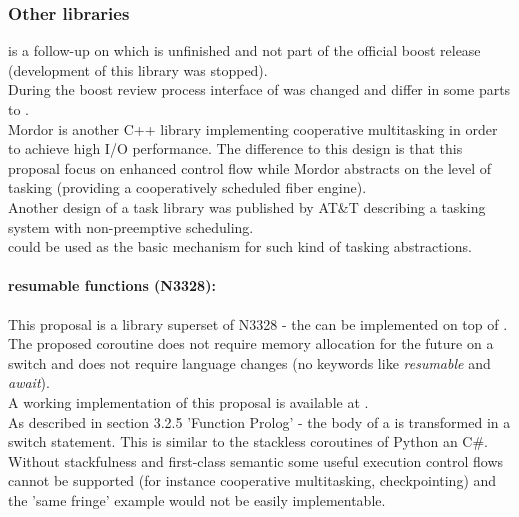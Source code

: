 \subsubsection*{Other libraries}
\boostcoroutine is a follow-up on \boostcorosum which is unfinished and
not part of the official boost release (development of this library was
stopped).\\
During the boost review process interface of \boostcoroutine was changed and
differ in some parts to \boostcorosum.\\
Mordor\cite{mordor} is another C++ library implementing cooperative multitasking
in order to achieve high I/O performance. The difference to this design is that
this proposal focus on enhanced control flow while Mordor\cite{mordor} abstracts
on the level of tasking (providing a cooperatively scheduled fiber engine).\\
Another design of a task library was published by AT\&T\cite{atnt1989} describing
a tasking system with non-preemptive scheduling.\\
\coro could be used as the basic mechanism for such kind of tasking abstractions.\\

\paragraph*{resumable functions (N3328\cite{n3328}):}
This proposal is a library superset of N3328 - the \resumfn can be implemented
on top of \coro. The proposed coroutine does not require memory allocation for
the future on a switch and does not require language changes (no keywords like
\textit{resumable} and \textit{await}).\\
A working implementation of this proposal is available at \boostcoroutine.\\
As described in section 3.2.5 'Function Prolog' - the body of a \resumfn is
transformed in a switch statement. This is similar to the stackless coroutines
of Python an C\#.\\
\newline
Without stackfulness and first-class semantic some useful execution control
flows cannot be supported (for instance cooperative multitasking,
checkpointing) and the 'same fringe' example would not be easily implementable.

